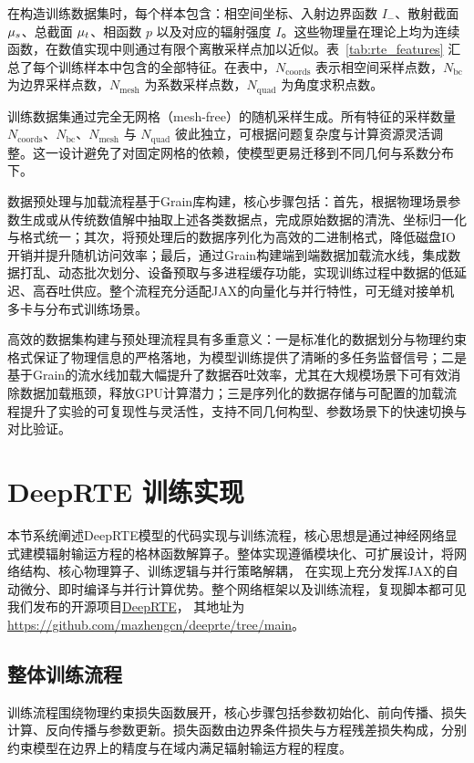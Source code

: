 在构造训练数据集时，每个样本包含：相空间坐标、入射边界函数 $I_-$、散射截面 $\mu_s$、总截面 $\mu_t$、相函数 $p$ 以及对应的辐射强度 $I$。这些物理量在理论上均为连续函数，在数值实现中则通过有限个离散采样点加以近似。表~\ref{tab:rte_features} 汇总了每个训练样本中包含的全部特征。在表中，$N_\text{coords}$ 表示相空间采样点数，$N_\text{bc}$ 为边界采样点数，$N_\text{mesh}$ 为系数采样点数，$N_\text{quad}$ 为角度求积点数。

训练数据集通过完全无网格（mesh-free）的随机采样生成。所有特征的采样数量 $N_{\text{coords}}$、$N_{\text{bc}}$、$N_{\text{mesh}}$ 与 $N_{\text{quad}}$ 彼此独立，可根据问题复杂度与计算资源灵活调整。这一设计避免了对固定网格的依赖，使模型更易迁移到不同几何与系数分布下。

数据预处理与加载流程基于Grain库构建，核心步骤包括：首先，根据物理场景参数生成或从传统数值解中抽取上述各类数据点，完成原始数据的清洗、坐标归一化与格式统一；其次，将预处理后的数据序列化为高效的二进制格式，降低磁盘IO开销并提升随机访问效率；最后，通过Grain构建端到端数据加载流水线，集成数据打乱、动态批次划分、设备预取与多进程缓存功能，实现训练过程中数据的低延迟、高吞吐供应。整个流程充分适配JAX的向量化与并行特性，可无缝对接单机多卡与分布式训练场景。

高效的数据集构建与预处理流程具有多重意义：一是标准化的数据划分与物理约束格式保证了物理信息的严格落地，为模型训练提供了清晰的多任务监督信号；二是基于Grain的流水线加载大幅提升了数据吞吐效率，尤其在大规模场景下可有效消除数据加载瓶颈，释放GPU计算潜力；三是序列化的数据存储与可配置的加载流程提升了实验的可复现性与灵活性，支持不同几何构型、参数场景下的快速切换与对比验证。

\section{DeepRTE 训练实现}

本节系统阐述DeepRTE模型的代码实现与训练流程，核心思想是通过神经网络显式建模辐射输运方程的格林函数解算子。整体实现遵循模块化、可扩展设计，将网络结构、核心物理算子、训练逻辑与并行策略解耦， 在实现上充分发挥JAX的自动微分、即时编译与并行计算优势。整个网络框架以及训练流程，复现脚本都可见我们发布的开源项目\href{https://github.com/mazhengcn/deeprte/tree/main}{DeepRTE}，
其地址为\url{https://github.com/mazhengcn/deeprte/tree/main}。
\subsection{整体训练流程}

训练流程围绕物理约束损失函数展开，核心步骤包括参数初始化、前向传播、损失计算、反向传播与参数更新。损失函数由边界条件损失与方程残差损失构成，分别约束模型在边界上的精度与在域内满足辐射输运方程的程度。

